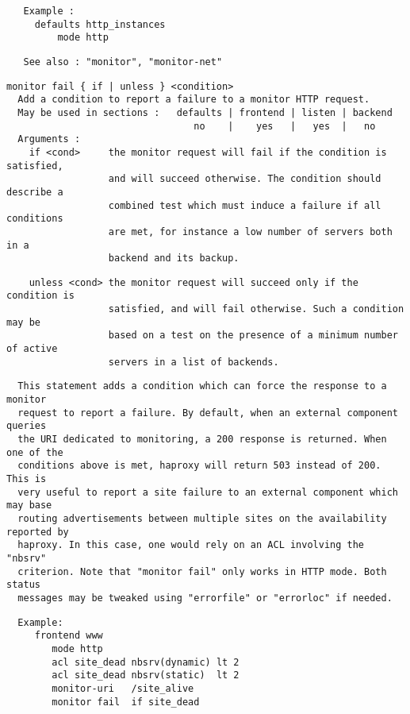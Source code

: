 \begin{verbatim}
   Example :
     defaults http_instances
         mode http
\end{verbatim}

\begin{verbatim}
   See also : "monitor", "monitor-net"
\end{verbatim}

\begin{verbatim}
monitor fail { if | unless } <condition>
  Add a condition to report a failure to a monitor HTTP request.
  May be used in sections :   defaults | frontend | listen | backend
                                 no    |    yes   |   yes  |   no
  Arguments :
    if <cond>     the monitor request will fail if the condition is satisfied,
                  and will succeed otherwise. The condition should describe a
                  combined test which must induce a failure if all conditions
                  are met, for instance a low number of servers both in a
                  backend and its backup.
\end{verbatim}

\begin{verbatim}
    unless <cond> the monitor request will succeed only if the condition is
                  satisfied, and will fail otherwise. Such a condition may be
                  based on a test on the presence of a minimum number of active
                  servers in a list of backends.
\end{verbatim}

\begin{verbatim}
  This statement adds a condition which can force the response to a monitor
  request to report a failure. By default, when an external component queries
  the URI dedicated to monitoring, a 200 response is returned. When one of the
  conditions above is met, haproxy will return 503 instead of 200. This is
  very useful to report a site failure to an external component which may base
  routing advertisements between multiple sites on the availability reported by
  haproxy. In this case, one would rely on an ACL involving the "nbsrv"
  criterion. Note that "monitor fail" only works in HTTP mode. Both status
  messages may be tweaked using "errorfile" or "errorloc" if needed.
\end{verbatim}

\begin{verbatim}
  Example:
     frontend www
        mode http
        acl site_dead nbsrv(dynamic) lt 2
        acl site_dead nbsrv(static)  lt 2
        monitor-uri   /site_alive
        monitor fail  if site_dead
\end{verbatim}

